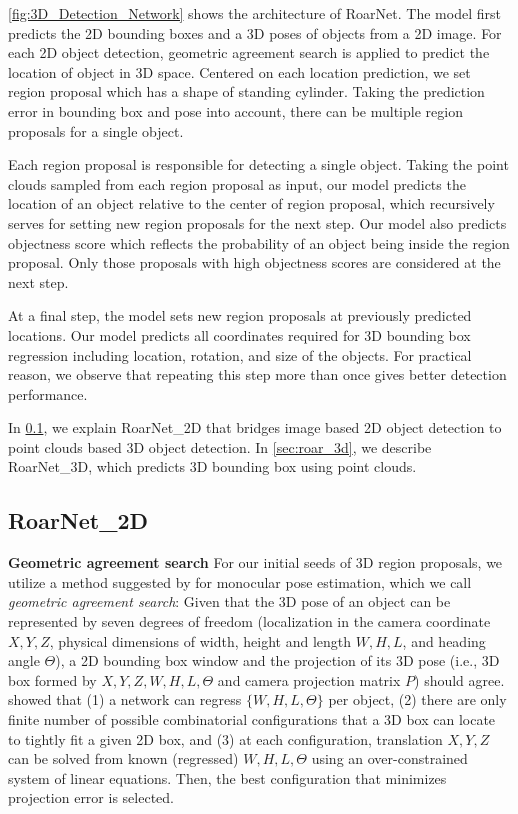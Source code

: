 \documentclass[letterpaper, 10 pt, conference]{ieeeconf}
\newcommand{\subsec}{\quad}
\begin{document}
\cref{fig:3D_Detection_Network} shows the architecture of RoarNet. The model first predicts the 2D bounding boxes and a 3D poses of objects from a 2D image. For each 2D object detection, geometric agreement search is applied to predict the location of object in 3D space.
Centered on each location prediction, we set region proposal which has a shape of standing cylinder. Taking the prediction error in bounding box and pose into account, there can be multiple region proposals for a single object.


Each region proposal is responsible for detecting a single object. Taking the point clouds sampled from each region proposal as input, our model predicts the location of an object relative to the center of region proposal, which recursively serves for setting new region proposals for the next step. Our model also predicts objectness score which reflects the probability of an object being inside the region proposal. Only those proposals with high objectness scores are considered at the next step.

At a final step, the model sets new region proposals at previously predicted locations.
Our model predicts all coordinates required for 3D bounding box regression including location, rotation, and size of the objects.
For practical reason, we observe that repeating this step more than once gives better detection performance.






In \cref{sec:roar_2d}, we explain RoarNet\_2D that bridges image based 2D object detection to point clouds based 3D object detection. In \cref{sec:roar_3d}, we describe RoarNet\_3D, which predicts 3D bounding box using point clouds.

\subsection{RoarNet\_2D} \label{sec:roar_2d}
\textbf{Geometric agreement search\subsec}
For our initial seeds of 3D region proposals, we utilize a method suggested by \cite{mousavian_3d_2017} for monocular pose estimation, which we call \emph{geometric agreement search}:
Given that the 3D pose of an object can be represented by seven degrees of freedom (localization in the camera coordinate $X, Y, Z$, physical dimensions of width, height and length $W, H, L$, and heading angle $\Theta$), a 2D bounding box window and the projection of its 3D pose (i.e., 3D box formed by $X, Y, Z, W, H, L, \Theta$ and camera projection matrix $P$) should agree. \cite{mousavian_3d_2017} showed that (1) a network can regress $\{W, H, L, \Theta\}$ per object, (2) there are only finite number of possible combinatorial configurations that a 3D box can locate to tightly fit a given 2D box, and (3) at each configuration, translation $X, Y, Z$ can be solved from known (regressed) $W, H, L, \Theta$ using an over-constrained system of linear equations. Then, the best configuration that minimizes projection error is selected.
\end{document}
